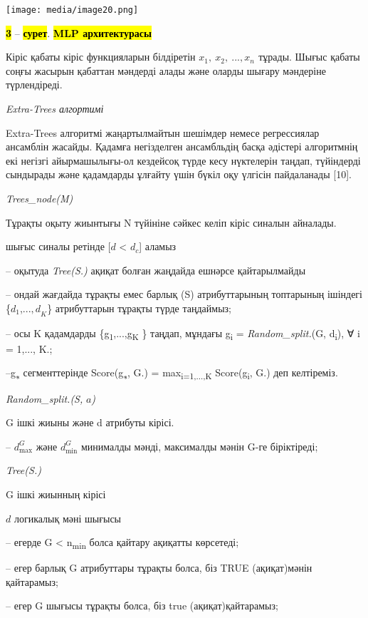 \documentclass[
]{article}
\begin{document}
\texttt{[image: media/image20.png]}

\textbf{\hl{3}} -- \textbf{\hl{сурет}}. \textbf{\hl{MLP архитектурасы}}

Кіріс қабаты кіріс функцияларын білдіретін
\hl{}\(x_{1},\ x_{2},\ ...,x_{n\ }\ \)тұрады. Шығыс қабаты соңғы жасырын
қабаттан мәндерді алады және оларды шығару мәндеріне түрлендіреді.

\emph{Extra-Trees алгортимі}

Extra-Trees алгоритмі жаңартылмайтын шешімдер немесе регрессиялар
ансамблін жасайды. Қадамға негізделген ансамбльдің басқа әдістері
алгоритмнің екі негізгі айырмашылығы-ол кездейсоқ түрде кесу нүктелерін
таңдап, түйіндерді сындырады және қадамдарды ұлғайту үшін бүкіл оқу
үлгісін пайдаланады {[}10{]}.

\emph{Trees\_node(M)}

Тұрақты оқыту жиынтығы N түйініне сәйкес келіп кіріс синалын айналады.

шығыс синалы ретінде {[}\(d\) \textless{} \(d_{c}\){]} аламыз

-- оқытуда \emph{Tree(S.)} ақиқат болған жаңдайда ешнәрсе қайтарылмайды

-- ондай жағдайда тұрақты емес барлық (S) атрибуттарының топтарының
ішіндегі \{\(d_{1}\),...\({,d}_{K}\)\} атрибуттарын тұрақты түрде
таңдаймыз;

-- осы K қадамдарды \{g\textsubscript{1},...,g\textsubscript{K} \}
таңдап, мұндағы g\textsubscript{i} = \emph{Random\_split.}(G,
d\textsubscript{i}), ∀ i = 1,..., K.;

--g\textsubscript{∗} сегменттерінде Score(g\textsubscript{∗}, G.) =
max\textsubscript{i=1,...,K} Score(g\textsubscript{i}, G.) деп
келтіреміз.

\emph{Random\_split.(S,} \(a\)\emph{)}

G ішкі жиыны және d атрибуты кірісі.

-- \(d_{\max}^{G}\) және \(d_{\min}^{G}\) минималды мәнді, максималды
мәнін G-ге біріктіреді;

\emph{Tree(S.)}

G ішкі жиынның кірісі

\(d\) логикалық мәні шығысы

-- егерде \textbar{} G \textbar{} \textless{} n\textsubscript{min} болса
қайтару ақиқатты көрсетеді;

-- егер барлық G атрибуттары тұрақты болса, біз TRUE (ақиқат)мәнін
қайтарамыз;

-- егер G шығысы тұрақты болса, біз true (ақиқат)қайтарамыз;
\end{document}
